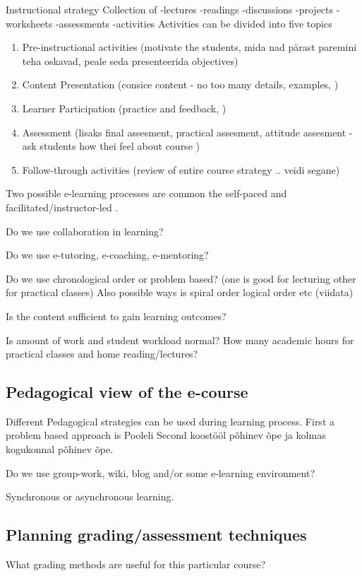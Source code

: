 Instructional strategy
Collection of 
-lectures
-readings
-discussions
-projects
-worksheets
-assessments
-activities
Activities can be divided into five topics
\begin{enumerate}
\item Pre-instructional activities (motivate the students, mida nad pärast paremini teha oskavad, peale seda presenteerida objectives)
\item Content Presentation (consice content - no too many details, examples, )
\item Learner Participation (practice and feedback, )
\item Assessment (lisaks final assesment, practical assesment, attitude assesment  - ask students how thei feel about course )
\item Follow-through activities (review of entire course strategy .. veidi segane)
\end{enumerate}



Two possible e-learning processes are common the self-paced and facilitated/instructor-led \citep[p.~10]{food2011learning}.

Do we use collaboration in learning? 

Do we use  e-tutoring, e-coaching, e-mentoring?

Do we use chronological order or problem based? (one is good for lecturing other for practical classes) Also possible ways is spiral order logical order etc {\color{red} (viidata) }

Is the content sufficient to gain learning outcomes?

Is amount of work and student workload normal? How many academic hours for practical classes and home reading/lectures?

\subsection{Pedagogical view of the e-course}
Different Pedagogical strategies can be used during learning process. First a problem based approach is {\color{red} Pooleli }
Second koostööl põhinev õpe ja kolmas kogukonnal põhinev õpe.

Do we use group-work, wiki, blog and/or some e-learning environment?

Synchronous or asynchronous learning.

\subsection{Planning grading/assessment techniques}
What grading methods are useful for this particular course?

